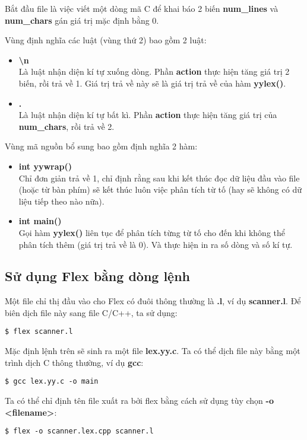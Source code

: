 \documentclass[../report.tex]{subfiles}
\begin{document}
Bắt đầu file là việc viết một dòng mã C để khai báo 2 biến 
\textbf{num\_lines} và \textbf{num\_chars} 
gán giá trị mặc định bằng 0. 

Vùng định nghĩa các luật (vùng thứ 2) bao gồm 2 luật:
\begin{itemize}
    \item \textbf{\textbackslash n} \\
        Là luật nhận diện kí tự xuống dòng. Phần \textbf{action}
        thực hiện tăng giá trị 2 biến, rồi trả về 1. 
        Giá trị trả về này sẽ là giá trị trả về của hàm 
        \textbf{yylex()}.
    \item \textbf{.} \\
        Là luật nhận diện kí tự bất kì. Phần \textbf{action}
        thực hiện tăng giá trị của \textbf{num\_chars}, rồi
        trả về 2.
\end{itemize}

Vùng mã nguồn bổ sung bao gồm định nghĩa 2 hàm: 
\begin{itemize}
    \item \textbf{int yywrap()} \\
        Chỉ đơn giản trả về 1, chỉ định rằng sau khi kết thúc đọc
        dữ liệu đầu vào file (hoặc từ bàn phím) sẽ kết thúc 
        luôn việc phân tích từ tố 
        (hay sẽ không có dữ liệu tiếp theo nào nữa).
    \item \textbf{int main()} \\
        Gọi hàm \textbf{yylex()} liên tục để phân tích từng từ tố
        cho đến khi không thể phân tích thêm (giá trị trả về là 0).  
        Và thực hiện in ra số dòng và số kí tự.
\end{itemize}



\subsection{Sử dụng Flex bằng dòng lệnh} 
Một file chỉ thị đầu vào cho Flex có đuôi 
thông thường là \textbf{.l}, ví dụ \textbf{scanner.l}. 
Để biên dịch file này sang file C/C++, ta sử dụng:
\begin{verbatim}
$ flex scanner.l
\end{verbatim}
Mặc định lệnh trên sẽ sinh ra một file \textbf{lex.yy.c}.
Ta có thể dịch file này bằng một trình dịch C thông thường, ví dụ \textbf{gcc}:
\begin{verbatim}
$ gcc lex.yy.c -o main
\end{verbatim}
Ta có thể chỉ định tên file xuất ra bởi flex bằng cách sử dụng tùy chọn \textbf{-o <filename>}:
\begin{verbatim}
$ flex -o scanner.lex.cpp scanner.l
\end{verbatim}
\end{document}
